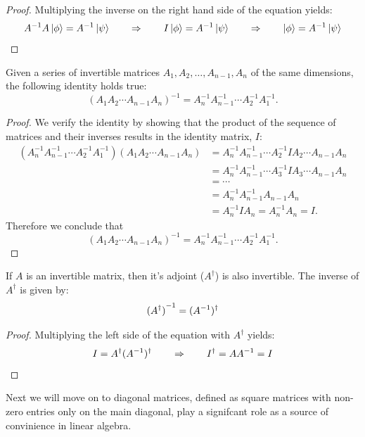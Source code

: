 \documentclass[12pt]{article}
\begin{document}
\begin{proof}
    Multiplying the inverse on the right hand side of the equation yields:
    $${A}^{-1} A \ket{\phi} = {A}^{-1} \ket{\psi} \qquad \Rightarrow \qquad I \ket{\phi} = {A}^{-1} \ket{\psi} \qquad \Rightarrow \qquad \ket{\phi} = {A}^{-1} \ket{\psi}$$
\end{proof}

\begin{theorem}
    Given a series of invertible matrices $A_{1}, A_{2}, \ldots, A_{n-1}, A_{n}$ of the same dimensions, the following identity holds true:
    \[
        (A_{1} A_{2} \cdots A_{n-1} A_{n})^{-1} = A_{n}^{-1} A_{n-1}^{-1} \cdots A_{2}^{-1} A_{1}^{-1}.
    \]
\end{theorem}

\begin{proof}
    We verify the identity by showing that the product of the sequence of matrices and their inverses results in the identity matrix, $I$:
    \begin{align*}
        (A_{n}^{-1} A_{n-1}^{-1} \cdots A_{2}^{-1} A_{1}^{-1})(A_{1} A_{2} \cdots A_{n-1} A_{n})
        &= A_{n}^{-1} A_{n-1}^{-1} \cdots A_{2}^{-1} I A_{2} \cdots A_{n-1} A_{n} \\
        &= A_{n}^{-1} A_{n-1}^{-1} \cdots A_{3}^{-1} I A_{3} \cdots A_{n-1} A_{n} \\
        &= \cdots \\
        &= A_{n}^{-1} A_{n-1}^{-1} A_{n-1} A_{n} \\
        &= A_{n}^{-1} I A_{n} = A_{n}^{-1} A_{n} = I.
    \end{align*}
    Therefore we conclude that
    \[
        (A_{1} A_{2} \cdots A_{n-1} A_{n})^{-1} = A_{n}^{-1} A_{n-1}^{-1} \cdots A_{2}^{-1} A_{1}^{-1}.
    \]
\end{proof}

\begin{theorem}
    If $A$ is an invertible matrix, then it's adjoint ($A^\dagger$) is also invertible. The inverse of $A^\dagger$ is given by:
    $${(A^\dagger)}^{-1} = ({A}^{-1})^\dagger$$ 
\end{theorem}

\begin{proof}
    Multiplying the left side of the equation with $A^\dagger$ yields:
    $$I = A^\dagger ({A}^{-1})^\dagger \qquad \Rightarrow \qquad I^\dagger = A {A}^{-1} = I$$
\end{proof}

Next we will move on to diagonal matrices, defined as square matrices with non-zero entries only on the main diagonal, play a signifcant role as a source of convinience in linear algebra. 
\end{document}

